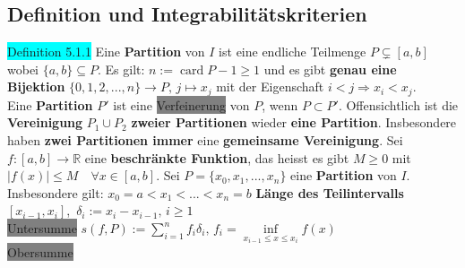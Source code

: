 \documentclass[landscape, 10pt]{article}
\newcommand{\R}{\mathbb{R}}
\begin{document}
\begin{multicols}{3}
       \subsection{Definition und Integrabilitätskriterien}
              \colorbox{cyan}{Definition 5.1.1} 
                     Eine \textbf{Partition} von \textcolor{NavyBlue}{$I$} 
                     ist eine endliche Teilmenge 
                     \textcolor{NavyBlue}{$P\subsetneq[a,b]$} 
                     wobei \textcolor{NavyBlue}{$\{a,b\}\subseteq P$}. 
                     Es gilt: 
                     \textcolor{NavyBlue}{$n:=\operatorname{card} P-1\geqslant1$} 
                     und es gibt \textbf{genau eine Bijektion} 
                     \textcolor{NavyBlue}{
                     $\{0,1,2,...,n\}\longrightarrow P,\,j\mapsto x_j$}
                     mit der Eigenschaft 
                     \textcolor{NavyBlue}{$i<j\Longrightarrow x_i<x_j$}.\\
              Eine \textbf{Partition} \textcolor{NavyBlue}{$P'$ }ist eine 
                     \colorbox{gray}{Verfeinerung} von \textcolor{NavyBlue}{$P$}, 
                     wenn \textcolor{NavyBlue}{$P\subset P'$}. 
                     Offensichtlich ist die \textbf{Vereinigung} 
                     \textcolor{NavyBlue}{$P_1\cup P_2$} \textbf{zweier Partitionen} 
                     wieder \textbf{eine Partition}. Insbesondere 
                     haben \textbf{zwei Partitionen immer} 
                     eine \textbf{gemeinsame Vereinigung}.
              Sei \textcolor{NavyBlue}{$f:[a,b]\longrightarrow\R$} eine 
                     \textbf{beschränkte Funktion}, 
                     das heisst es gibt 
                     \textcolor{NavyBlue}{$M\geqslant0$} mit 
                     \textcolor{NavyBlue}{$|f(x)|\leqslant M\quad\forall x\in[a,b]$}. 
              Sei \textcolor{NavyBlue}{$P=\{x_0,x_1,...,x_n\}$} eine 
                     \textbf{Partition} von 
                     \textcolor{NavyBlue}{$I$}. Insbesondere gilt: 
                     \textcolor{NavyBlue}{$x_0=a<x_1<...<x_n=b$}
              \textbf{Länge des Teilintervalls} 
                     \textcolor{NavyBlue}{$[x_{i-1},x_i]$},\,
                     \textcolor{NavyBlue}{$\delta_i:=x_i-x_{i-1},\,i\geqslant1$}\\
              \colorbox{gray}{Untersumme} 
                     \textcolor{NavyBlue}{$s(f,P):=\sum_{i=1}^nf_i\delta_i,\,
                     f_i=\inf\limits_{x_{i-1}\leqslant x\leqslant x_i}f(x)$}\\ 
              \colorbox{gray}{Obersumme} 

\end{multicols}
\end{document}
